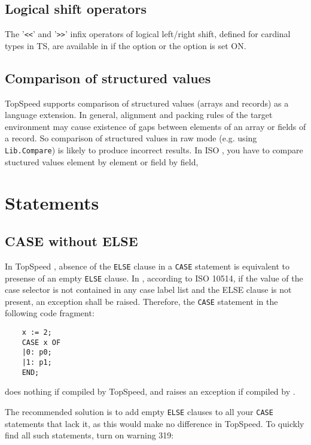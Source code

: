 \subsection{Logical shift operators}

    The '\verb'<<'' and '\verb'>>'' infix operators of logical
    left/right shift, defined for cardinal types in TS, are available in
    \XDS{} if the option  or the option  is 
    set ON.

\subsection{Comparison of structured values}

    TopSpeed \mt{} supports comparison of structured values (arrays and 
    records) as a language extension. In general, alignment and 
    packing rules of the target environment may cause existence of 
    gaps between elements of an array or fields of a record. 
    So comparison of structured values in raw mode (e.g. using 
    \verb'Lib.Compare') is likely to produce incorrect results.
    In ISO \mt{}, you have to compare stuctured values element by element 
    or field by field,


\section{Statements}

\subsection{CASE without ELSE}

In TopSpeed \mt{}, absence of the \verb'ELSE' clause in a \verb'CASE'
statement is equivalent to presense of an empty \verb'ELSE' clause.
In \xds{} \mt{}, according to ISO 10514, if the value of the case
selector is not contained in any case label list and the ELSE clause
is not present, an exception shall be raised. Therefore, the \verb'CASE'
statement in the following code fragment:

\begin{verbatim}
    x := 2;
    CASE x OF
    |0: p0;
    |1: p1;
    END;
\end{verbatim}

does nothing if compiled by TopSpeed, and raises an exception
if compiled by \xds{}.

The recommended solution is to add empty \verb'ELSE' clauses to all your
\verb'CASE' statements that lack it, as this would make no difference in 
TopSpeed. To quickly find all such statements, turn on warning 319:

